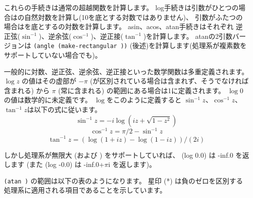 \begin{entry}{%
}

これらの手続きは通常の超越関数を計算します。
{\cf log}手続きは引数がひとつの場合はの自然対数を計算し(10を底とする対数ではありません)、
引数がふたつの場合はを底とするの対数を計算します。
{\cf asin}、{\cf acos}、{\cf atan}手続きはそれぞれ
逆正弦($\sin^{-1}$)、逆余弦($\cos^{-1}$)、逆正接($\tan^{-1}$)を計算します。
{\cf atan}の2引数バージョンは
{\tt (angle (make-rectangular  ))}
(後述)を計算します(処理系が複素数をサポートしていない場合でも)。

一般的に対数、逆正弦、逆余弦、逆正接といった数学関数は多重定義されます。
$\log z$ の値はその虚部が $-\pi$ ({}が区別されている場合は含まれず、そうでなければ含まれる)
から $\pi$ (常に含まれる) の範囲にある場合は1に定義されます。
$\log 0$の値は数学的に未定義です。
$\log$をこのように定義すると
$\sin^{-1} z$、$\cos^{-1} z$、$\tan^{-1} z$は以下の式に従います。
$$\sin^{-1} z = -i \log (i z + \sqrt{1 - z^2})$$
$$\cos^{-1} z = \pi / 2 - \sin^{-1} z$$
$$\tan^{-1} z = (\log (1 + i z) - \log (1 - i z)) / (2 i)$$

しかし処理系が無限大 (および {}) をサポートしていれば、
{\cf (log 0.0)} は {\cf -inf.0} を返します
(また {\cf (log -0.0)} は {\cf -inf.0+$\pi$i} を返します)。

\texttt{({\cf atan}  )} の範囲は以下の表のようになります。
星印 (*) は負のゼロを区別する処理系に適用される項目であることを示しています。


\end{entry}
